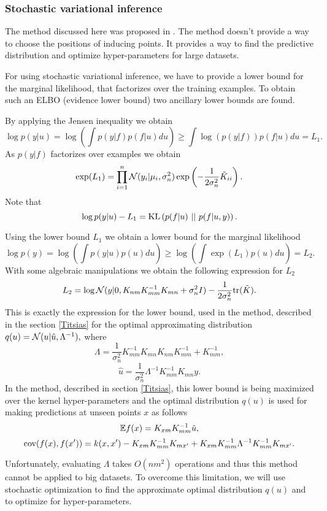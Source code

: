 \documentclass[12pt]{article}
\begin{document}
	\pagebreak
	\subsubsection{Stochastic variational inference}
		\label{svi}
	
		\hspace{0.6cm}The method discussed here was proposed in \cite{BigData}. The method doesn't provide a way to choose the positions of inducing points. It provides a way to find the predictive distribution and optimize hyper-parameters for large datasets.
		
		For using stochastic variational inference, we have to provide a lower bound for the marginal likelihood, that factorizes over the training examples. To obtain such an ELBO (evidence lower bound) two ancillary lower bounds are found. 
		
		By applying the Jensen inequality we obtain
		$$ \log p(y | u) = \log \left ( \int p(y|f) p(f | u) du\right) \ge  \int \log (p(y|f)) p(f | u) du = L_1.$$	
		As $p(y | f)$ factorizes over examples we obtain
		$$\exp(L_1) = \prod_{i = 1}^{n} \mathcal{N}(y_i| \mu_i, \sigma_n^2) \exp \left( -\frac 1 {2\sigma_n^2} \tilde K_{ii}\right).$$
		Note that 
		$$\log p(y | u) - L_1 = \mbox{KL}\left(p(f | u)\mbox{ || }p(f | u, y)\right).$$
		
		Using the lower bound $L_1$ we obtain a lower bound for the marginal likelihood
		$$\log p(y) = \log \left( \int p(y|u) p(u) du\right) \ge \log \left( \int \exp(L_1) p(u) du\right) = L_2.$$
		With some algebraic manipulations we obtain the following expression for $L_2$
		$$L_2 = \log \mathcal{N}(y| 0, K_{nm} K_{mm}^{-1} K_{mn} + \sigma_n^2 I) - \frac 1 {2 \sigma_n^2} \mbox{tr} (\tilde K).$$
		This is exactly the expression for the lower bound, used in the method, described in the section \ref{Titsias} for the optimal approximating distribution $q(u) = \mathcal{N}(u |\hat u, \Lambda^{-1}),$ where
		$$\Lambda = \frac 1 {\sigma_n^2} K_{mm}^{-1} K_{mn} K_{nm} K_{mm}^{-1} + K_{mm}^{-1},$$
		$$\hat u = \frac 1 {\sigma_n^2} \Lambda^{-1} K_{mm}^{-1} K_{mn} y.$$
		In the method, described in section \ref{Titsias}, this lower bound is being maximized over the kernel hyper-parameters and the optimal distribution $q(u)$ is used for making predictions at unseen points $x$ as follows
		$$\mathbb{E} f(x) = K_{xm} K_{mm}^{-1} \hat u, $$
		$$\mbox{cov}(f(x), f(x')) = k(x, x') - K_{xm} K_{mm}^{-1} K_{mx'} + K_{xm} K_{mm}^{-1} \Lambda^{-1} K_{mm}^{-1} K_{mx'}.$$
		
		Unfortunately, evaluating $\Lambda$ takes $O(n m^2)$ operations and thus this method cannot be applied to big datasets. To overcome this limitation, we will use stochastic optimization to find the approximate optimal distribution $q(u)$ and to optimize for hyper-parameters. 
		
\end{document}
